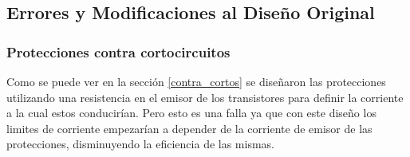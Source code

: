 \subsection{Errores y Modificaciones al Diseño Original}
\bigskip
\subsubsection{Protecciones contra cortocircuitos}
\medskip
Como se puede ver en la sección \ref{contra_cortos} se diseñaron las protecciones utilizando una resistencia en el emisor de los transistores para definir la corriente a la cual estos conducirían. Pero esto es una falla ya que con este diseño los limites de corriente empezarían a depender de la corriente de emisor de las protecciones, disminuyendo la eficiencia de las mismas. 